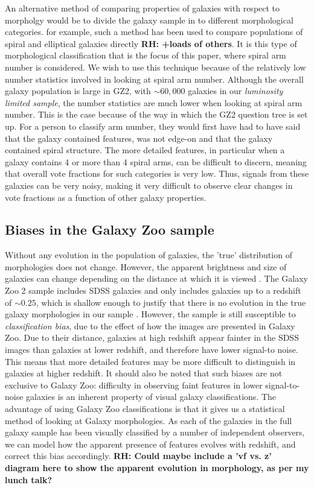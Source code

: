 \documentclass[useAMS,usenatbib]{mn2e}
\newcommand{\rh}[1]{{\bf \textcolor{RoyalPurple}{RH: #1}}}
\begin{document}
An alternative method of comparing properties of galaxies with respect to morpholgy would be to divide the galaxy sample in to different morphological categories.  for example, such a method has been used to compare populations of spiral and elliptical galaxies directly \citep{Skibba_09,Smethurst_15} \rh{+loads of others}. It is this type of morphological classification that is the focus of this paper, where spiral arm number is considered. We wish to use this technique because of the relatively low number statistics involved in looking at spiral arm number. Although the overall galaxy population is large in GZ2, with $\sim 60,000$ galaxies in our \textit{luminosity limited sample}, the number statistics are much lower when looking at spiral arm number. This is the case because of the way in which the GZ2 question tree is set up. For a person to classify arm number, they would first have had to have said that the galaxy contained features, was not edge-on and that the galaxy contained spiral structure. The more detailed features, in particular when a galaxy contains 4 or more than 4 spiral arms, can be difficult to discern, meaning that overall vote fractions for such categories is very low. Thus, signals from these galaxies can be very noisy, making it very difficult to observe clear changes in vote fractions as a function of other galaxy properties.

\subsection{Biases in the Galaxy Zoo sample}
\label{sec:biases}
Without any evolution in the population of galaxies, the 'true' distribution of morphologies does not change. However, the apparent brightness and size of galaxies can change depending on the distance at which it is viewed \citep{Bamford_09}. The Galaxy Zoo 2 sample includes SDSS galaxies and only includes galaxies up to a redshift of $\sim 0.25$, which is shallow enough to justify that there is no evolution in the true galaxy morphologies in our sample \citep{Willett_13}. However, the sample is still susceptible to \textit{classification bias}, due to the effect of how the images are presented in Galaxy Zoo. Due to their distance, galaxies at high redshift appear fainter in the SDSS images than galaxies at lower redshift, and therefore have lower signal-to noise. This means that more detailed features may be more difficult to distinguish in galaxies at higher redshift. It should also be noted that such biases are not exclusive to Galaxy Zoo: difficulty in observing faint features in lower signal-to-noise galaxies is an inherent property of visual galaxy classifications. The advantage of using Galaxy Zoo classifications is that it gives us a statistical method of looking at Galaxy morphologies. As each of the galaxies in the full galaxy sample has been visually classified by a number of independent observers, we can model how the apparent presence of features evolves with redshift, and correct this bias accordingly.  \rh{Could maybe include a 'vf vs. z' diagram here to show the apparent evolution in morphology, as per my lunch talk?}
\end{document}

